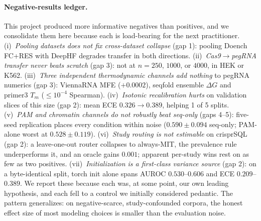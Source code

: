 \paragraph{Negative-results ledger.}
This project produced more informative negatives than positives, and we
consolidate them here because each is load-bearing for the next
practitioner.
(i)~\emph{Pooling datasets does not fix cross-dataset collapse} (gap 1):
pooling Doench FC+RES with DeepHF degrades transfer in both directions.
(ii)~\emph{Cas9$\to$pegRNA transfer never beats scratch} (gap 3):
not at $n=250$, $1000$, or $4000$, in HEK or K562.
(iii)~\emph{Three independent thermodynamic channels add nothing} to
pegRNA numerics (gap 3): ViennaRNA MFE ($+0.0002$), seqfold ensemble
$\Delta G$ and primer3 $T_m$ ($\le 10^{-4}$ Spearman).
(iv)~\emph{Isotonic recalibration hurts} on validation slices of this
size (gap 2): mean ECE $0.326 \to 0.389$, helping 1 of 5 splits.
(v)~\emph{PAM and chromatin channels do not robustly beat seq-only}
(gaps 4--5): five-seed replication places every condition within noise
($0.590 \pm 0.094$ seq-only; PAM-alone worst at $0.528 \pm 0.119$).
(vi)~\emph{Study routing is not estimable} on crisprSQL (gap 2): a
leave-one-out router collapses to always-MIT, the prevalence rule
underperforms it, and an oracle gains $0.001$; apparent per-study wins
rest on as few as two positives.
(vii)~\emph{Initialization is a first-class variance source} (gap 2):
on a byte-identical split, torch init alone spans AUROC
$0.530$--$0.606$ and ECE $0.209$--$0.389$.
We report these because each was, at some point, our own leading
hypothesis, and each fell to a control we initially considered
pedantic. The pattern generalizes: on negative-scarce,
study-confounded corpora, the honest effect size of most modeling
choices is smaller than the evaluation noise.
